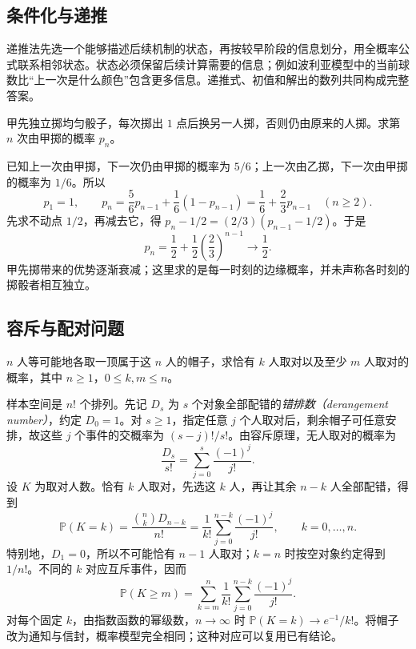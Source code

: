 \subsection{条件化与递推}
\label{subsec:study-probability-recursion}

递推法先选一个能够描述后续机制的状态，再按较早阶段的信息划分，用全概率公式联系相邻状态。状态必须保留后续计算需要的信息；例如波利亚模型中的当前球数比“上一次是什么颜色”包含更多信息。递推式、初值和解出的数列共同构成完整答案。

\begin{example}
\label{ex:study-dice-turn-recursion}
甲先独立掷均匀骰子，每次掷出 $1$ 点后换另一人掷，否则仍由原来的人掷。求第 $n$ 次由甲掷的概率 $p_n$。
\end{example}

\begin{solve}
已知上一次由甲掷，下一次仍由甲掷的概率为 $5/6$；上一次由乙掷，下一次由甲掷的概率为 $1/6$。所以
\[
 p_1=1,\qquad p_n=\frac56p_{n-1}+\frac16(1-p_{n-1})
 =\frac16+\frac23p_{n-1}\quad(n\ge2).
\]
先求不动点 $1/2$，再减去它，得 $p_n-1/2=(2/3)(p_{n-1}-1/2)$。于是
\begin{equation}
 p_n=\frac12+\frac12\left(\frac23\right)^{n-1}\longrightarrow\frac12.
 \label{eq:study-dice-turn-recursion}
\end{equation}
甲先掷带来的优势逐渐衰减；这里求的是每一时刻的边缘概率，并未声称各时刻的掷骰者相互独立。
\end{solve}

\subsection{容斥与配对问题}
\label{subsec:study-matching-problem}

\begin{example}
\label{ex:study-derangements}
$n$ 人等可能地各取一顶属于这 $n$ 人的帽子，求恰有 $k$ 人取对以及至少 $m$ 人取对的概率，其中 $n\ge1$，$0\le k,m\le n$。
\end{example}

\begin{solve}
样本空间是 $n!$ 个排列。先记 $D_s$ 为 $s$ 个对象全部配错的\emph{错排数（derangement number）}，约定 $D_0=1$。对 $s\ge1$，指定任意 $j$ 个人取对后，剩余帽子可任意安排，故这些 $j$ 个事件的交概率为 $(s-j)!/s!$。由容斥原理，无人取对的概率为
\[
 \frac{D_s}{s!}=\sum_{j=0}^{s}\frac{(-1)^j}{j!}.
\]
设 $K$ 为取对人数。恰有 $k$ 人取对，先选这 $k$ 人，再让其余 $n-k$ 人全部配错，得到
\begin{equation}
 \mathbb P(K=k)=\frac{\binom nk D_{n-k}}{n!}
 =\frac1{k!}\sum_{j=0}^{n-k}\frac{(-1)^j}{j!},
 \qquad k=0,\ldots,n.
 \label{eq:study-matching-exact}
\end{equation}
特别地，$D_1=0$，所以不可能恰有 $n-1$ 人取对；$k=n$ 时按空对象约定得到 $1/n!$。不同的 $k$ 对应互斥事件，因而
\[
 \mathbb P(K\ge m)=\sum_{k=m}^{n}\frac1{k!}
       \sum_{j=0}^{n-k}\frac{(-1)^j}{j!}.
\]
对每个固定 $k$，由指数函数的幂级数，$n\to\infty$ 时 $\mathbb P(K=k)\to e^{-1}/k!$。将帽子改为通知与信封，概率模型完全相同；这种对应可以复用已有结论。
\end{solve}

